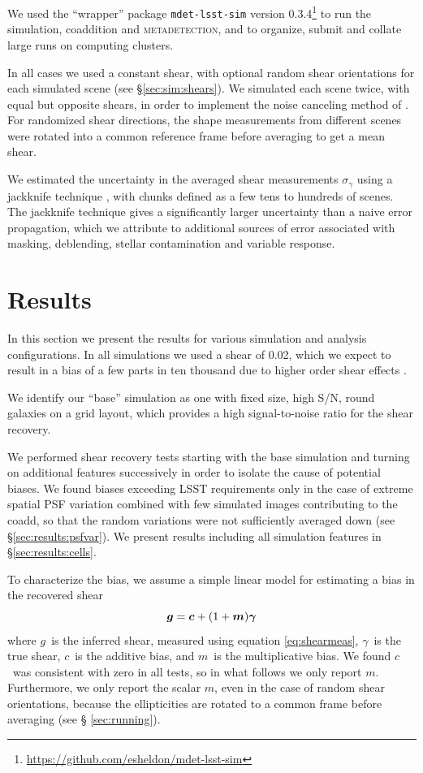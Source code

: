 \documentclass[twocolumn,twocolappendix,astrosym]{openjournal}
\newcommand{\vecg}{\mbox{\boldmath $g$}}
\newcommand{\vecc}{\mbox{\boldmath $c$}}
\newcommand{\vecm}{\mbox{\boldmath $m$}}
\newcommand{\mdet}{\textsc{metadetection}}
\newcommand{\vecgam}{\mbox{\boldmath $\gamma$}}
\newcommand{\mshear}{0.02}
\begin{document}
We used the ``wrapper'' package \texttt{mdet-lsst-sim} version
0.3.4\footnote{\url{https://github.com/esheldon/mdet-lsst-sim}} to run the
simulation, coaddition and \mdet, and to organize, submit and collate large
runs on computing clusters.

In all cases we used a constant shear, with optional random shear orientations
for each simulated scene (see \S \ref{sec:sim:shears}).  We simulated each
scene twice, with equal but opposite shears, in order to implement the noise
canceling method of \cite{pujol2019}.  For randomized shear directions, the
shape measurements from different scenes were rotated into a common reference
frame before averaging to get a mean shear.

We estimated the uncertainty in the averaged shear measurements
$\sigma_{\gamma}$ using a jackknife technique \citep{LuptonStats1993}, with
chunks defined as a few tens to hundreds of scenes.  The jackknife technique
gives a significantly larger uncertainty than a naive error propagation, which
we attribute to additional sources of error associated with masking,
deblending, stellar contamination and variable response.

\section{Results} \label{sec:results}

In this section we present the results for various simulation and analysis
configurations.  In all simulations we used a shear of \mshear, which we expect
to result in a bias of a few parts in ten thousand due to higher order
shear effects \citep{SheldonMcal2017,mdet20}.

We identify our ``base'' simulation as one with fixed size, high S/N, round
galaxies on a grid layout, which provides a high signal-to-noise ratio for the
shear recovery.

We performed shear recovery tests starting with the base simulation and turning
on additional features successively in order to isolate the cause of potential
biases.  We found biases exceeding LSST requirements only in the case of
extreme spatial PSF variation combined with few simulated images contributing
to the coadd, so that the random variations were not sufficiently averaged down
(see \S \ref{sec:results:psfvar}).  We present results including all simulation
features in \S \ref{sec:results:cells}.

To characterize the bias, we assume a simple linear model \citep[see,
e.g.,][]{heymans2006} for estimating a bias in the recovered shear
\begin{equation} \label{eq:m}
\vecg = \vecc + (1 + \vecm) \vecgam
\end{equation}
where \vecg\ is the inferred shear, measured using equation \ref{eq:shearmeas},
\vecgam\ is the true shear, \vecc\ is the additive bias, and \vecm\ is the
multiplicative bias. We found \vecc\ was consistent with zero in all tests, so
in what follows we only report \vecm.  Furthermore, we only report
the scalar $m$, even in the case of random shear orientations, because
the ellipticities are rotated to a common frame before averaging (see \S
\ref{sec:running}).
\end{document}
